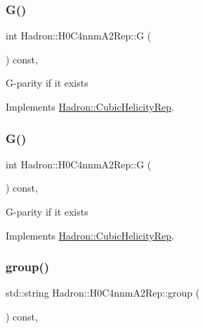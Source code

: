 \subsubsection{\texorpdfstring{G()}{G()}\hspace{0.1cm}{\footnotesize\ttfamily [1/2]}}
{\footnotesize\ttfamily int Hadron\+::\+H0\+C4nnm\+A2\+Rep\+::G (\begin{DoxyParamCaption}{ }\end{DoxyParamCaption}) const\hspace{0.3cm}{\ttfamily [inline]}, {\ttfamily [virtual]}}

G-\/parity if it exists 

Implements \mbox{\hyperlink{structHadron_1_1CubicHelicityRep_a50689f42be1e6170aa8cf6ad0597018b}{Hadron\+::\+Cubic\+Helicity\+Rep}}.

\mbox{\label{structHadron_1_1H0C4nnmA2Rep_a64418754427c737f79939aef4f18d294}} 
\subsubsection{\texorpdfstring{G()}{G()}\hspace{0.1cm}{\footnotesize\ttfamily [2/2]}}
{\footnotesize\ttfamily int Hadron\+::\+H0\+C4nnm\+A2\+Rep\+::G (\begin{DoxyParamCaption}{ }\end{DoxyParamCaption}) const\hspace{0.3cm}{\ttfamily [inline]}, {\ttfamily [virtual]}}

G-\/parity if it exists 

Implements \mbox{\hyperlink{structHadron_1_1CubicHelicityRep_a50689f42be1e6170aa8cf6ad0597018b}{Hadron\+::\+Cubic\+Helicity\+Rep}}.

\mbox{\label{structHadron_1_1H0C4nnmA2Rep_a04d0d1b6a859d992423de875ce86f980}} 
\subsubsection{\texorpdfstring{group()}{group()}\hspace{0.1cm}{\footnotesize\ttfamily [1/3]}}
{\footnotesize\ttfamily std\+::string Hadron\+::\+H0\+C4nnm\+A2\+Rep\+::group (\begin{DoxyParamCaption}{ }\end{DoxyParamCaption}) const\hspace{0.3cm}{\ttfamily [inline]}, {\ttfamily [virtual]}}


